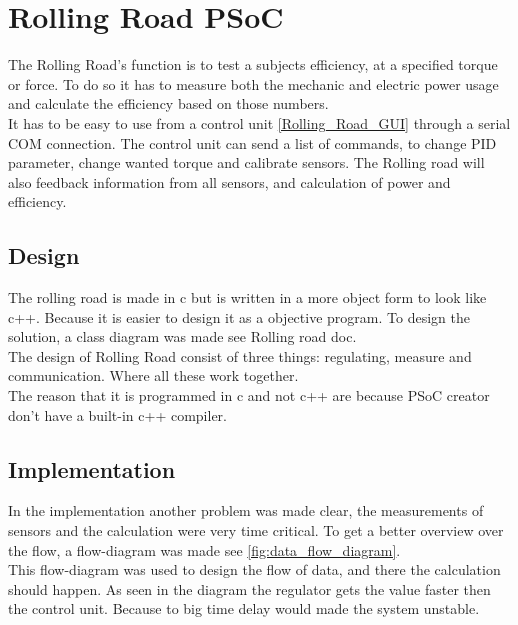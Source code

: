 \section{Rolling Road PSoC} 
The Rolling Road's function is to test a subjects efficiency, at a specified torque or force. To do so it has to measure both the mechanic and electric power usage and calculate the efficiency based on those numbers.\\

It has to be easy to use from a control unit \vref{Rolling_Road_GUI} through a serial COM connection. The control unit can send a list of commands, to change PID parameter, change wanted torque and calibrate sensors. The Rolling road will also feedback information from all sensors, and calculation of power and efficiency.\\
\subsection{Design}
The rolling road is made in c but is written in a more object form to look like c++. Because it is easier to design it as a objective program. To design the solution, a class diagram was made see Rolling road doc.\\

The design of Rolling Road consist of three things: regulating, measure and communication. Where all these work together.\\

The reason that it is programmed in c and not c++ are because PSoC creator don't have a built-in c++ compiler. 
\subsection{Implementation}
In the implementation another problem was made clear, the measurements of sensors and the calculation were very time critical. To get a better overview over the flow, a flow-diagram was made see \vref{fig:data_flow_diagram}.\\

This flow-diagram was used to design the flow of data, and there the calculation should happen. As seen in the diagram the regulator gets the value faster then the control unit. Because to big time delay would made the system unstable.\\


